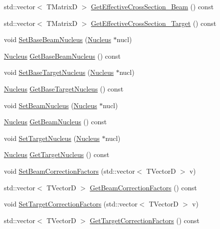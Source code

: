 \begin{DoxyCompactItemize}
\item 
std\-::vector$<$ T\-Matrix\-D $>$ \hyperlink{classCoulExSimMinFCN_a0b817c33cf489d186aebfc78bcde5774}{Get\-Effective\-Cross\-Section\-\_\-\-Beam} () const 
\item 
std\-::vector$<$ T\-Matrix\-D $>$ \hyperlink{classCoulExSimMinFCN_a581cefebd576c49c6730d20fd8d3b321}{Get\-Effective\-Cross\-Section\-\_\-\-Target} () const 
\item 
void \hyperlink{classCoulExSimMinFCN_a1a4fcd776281ea6fcae4ad6ef2d2f3cf}{Set\-Base\-Beam\-Nucleus} (\hyperlink{classNucleus}{Nucleus} $\ast$nucl)
\item 
\hyperlink{classNucleus}{Nucleus} \hyperlink{classCoulExSimMinFCN_acf3b8e0f60df6a84901bb9b7e869fb1e}{Get\-Base\-Beam\-Nucleus} () const 
\item 
void \hyperlink{classCoulExSimMinFCN_a5d994181f46bc33a9fdefa276c2509b3}{Set\-Base\-Target\-Nucleus} (\hyperlink{classNucleus}{Nucleus} $\ast$nucl)
\item 
\hyperlink{classNucleus}{Nucleus} \hyperlink{classCoulExSimMinFCN_a400ad2f74a60a4cc3e5e55e6f336721f}{Get\-Base\-Target\-Nucleus} () const 
\item 
void \hyperlink{classCoulExSimMinFCN_a95e28ca91e23afe1b0c4d8e2f57125cf}{Set\-Beam\-Nucleus} (\hyperlink{classNucleus}{Nucleus} $\ast$nucl)
\item 
\hyperlink{classNucleus}{Nucleus} \hyperlink{classCoulExSimMinFCN_a9527881e781a828fca6dd8362284548a}{Get\-Beam\-Nucleus} () const 
\item 
void \hyperlink{classCoulExSimMinFCN_a5e3af68fd0147c9bfa96382865d12bf9}{Set\-Target\-Nucleus} (\hyperlink{classNucleus}{Nucleus} $\ast$nucl)
\item 
\hyperlink{classNucleus}{Nucleus} \hyperlink{classCoulExSimMinFCN_aa25534be226b28ab3152f29894e6937d}{Get\-Target\-Nucleus} () const 
\item 
void \hyperlink{classCoulExSimMinFCN_a92ab3ca942b0d911ddc88357a64aacc6}{Set\-Beam\-Correction\-Factors} (std\-::vector$<$ T\-Vector\-D $>$ v)
\item 
std\-::vector$<$ T\-Vector\-D $>$ \hyperlink{classCoulExSimMinFCN_ac0f210f5b6f5084e8fdc9287c1d5dc55}{Get\-Beam\-Correction\-Factors} () const 
\item 
void \hyperlink{classCoulExSimMinFCN_ae32103827c4ee6c09095ce2906bf138b}{Set\-Target\-Correction\-Factors} (std\-::vector$<$ T\-Vector\-D $>$ v)
\item 
std\-::vector$<$ T\-Vector\-D $>$ \hyperlink{classCoulExSimMinFCN_afc423c36060089661594cc7e6aed8c83}{Get\-Target\-Correction\-Factors} () const 

\end{DoxyCompactItemize}
